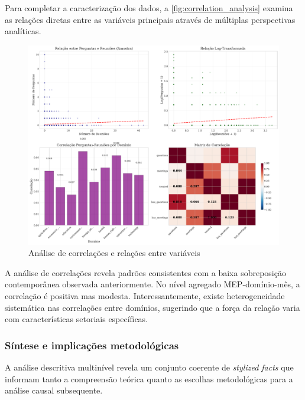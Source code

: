 Para completar a caracterização dos dados, a \autoref{fig:correlation_analysis} examina as relações diretas entre as variáveis principais através de múltiplas perspectivas analíticas.

\begin{figure}[htbp]
\centering
\includegraphics[width=\textwidth]{figures/fig4_correlation_analysis.pdf}
\caption{Análise de correlações e relações entre variáveis}
\label{fig:correlation_analysis}
\end{figure}

A análise de correlações revela padrões consistentes com a baixa sobreposição contemporânea observada anteriormente. No nível agregado MEP-domínio-mês, a correlação é positiva mas modesta. Interessantemente, existe heterogeneidade sistemática nas correlações entre domínios, sugerindo que a força da relação varia com características setoriais específicas.

\subsubsection{Síntese e implicações metodológicas}

A análise descritiva multinível revela um conjunto coerente de \textit{stylized facts} que informam tanto a compreensão teórica quanto as escolhas metodológicas para a análise causal subsequente.

